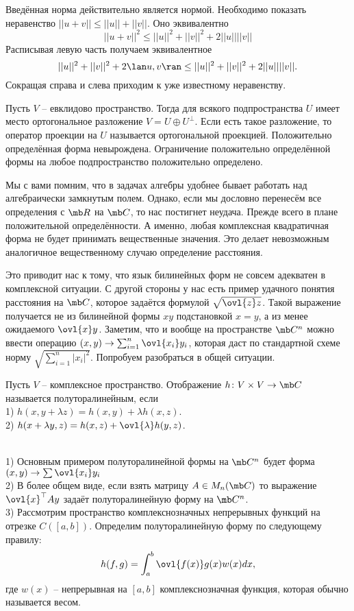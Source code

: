 \lm Введённая норма действительно является нормой.
\proof Необходимо показать неравенство $||u+v||\leq ||u||+||v||$. Оно эквивалентно $$||u+v||^2 \leq ||u||^2+||v||^2+2||u||||v||$$
Расписывая левую часть получаем эквивалентное
$$ ||u||^2+||v||^2+2\lan u,v\ran \leq ||u||^2+||v||^2+2||u||||v||.$$
Сокращая справа и слева приходим к уже известному неравенству.
\endproof
\elm

 
\lm Пусть $V$ -- евклидово пространство. Тогда для всякого подпространства $U$ имеет место ортогональное разложение $V=U\oplus U^{\bot}$. Если есть такое разложение, то оператор проекции на $U$ называется ортогональной проекцией.
\elm
\proof Положительно определённая форма невырождена. Ограничение положительно определённой формы на любое подпространство положительно определено.
\endproof



Мы с вами помним, что в задачах алгебры  удобнее бывает работать над алгебраически замкнутым полем. Однако, если мы дословно перенесём все определения с $\mb R$ на $\mb C$, то нас постигнет неудача. Прежде всего в плане положительной определённости. А именно, любая комплексная квадратичная форма не будет принимать вещественные значения. Это делает невозможным аналогичное вещественному случаю определение расстояния. 

Это приводит нас к тому, что язык билинейных форм не совсем адекватен в комплексной ситуации. С другой стороны у нас есть пример удачного понятия расстояния на $\mb C$, которое задаётся формулой $\sqrt{\ovl{z}z}$. Такой выражение получается не из билинейной формы $xy$ подстановкой $x=y$, а из менее ожидаемого $\ovl{x}y$. Заметим, что и вообще на пространстве $\mb C^n$ можно ввести операцию $
(x,y) \to \sum_{i=1}^n \ovl{x_i}y_i$, которая даст по стандартной схеме норму $\sqrt{\sum_{i=1}^n |x_i|^2}$. Попробуем разобраться в общей ситуации.

\dfn Пусть $V$ -- комплексное пространство.  Отображение $h\colon V \times V \to \mb C$ называется полуторалинейным, если \\
1) $h(x,y+\lambda z)=h(x,y)+\lambda h(x,z)$. \\
2) $h(x+\lambda y,z)=h(x,z)+\ovl{\lambda} h(y,z)$.
\edfn

\exm\\
1) Основным примером полуторалинейной формы на $\mb C^n$ будет форма $(x,y)\to \sum \ovl{x_i}y_i$\\
2) В более общем виде, если взять матрицу $A\in M_n(\mb C)$  то выражение $\ovl{x}^{\top}Ay$ задаёт полуторалинейную форму на $\mb C^n$.\\
3) Рассмотрим пространство комплекснозначных непрерывных функций на отрезке $C([a,b])$. Определим полуторалинейную форму по следующему правилу:
$$h(f,g)=\int_a^b \ovl{f(x)}g(x)w(x)dx,$$
где $w(x)$ -- непрерывная на $[a,b]$ комплекснозначная функция, которая обычно называется весом.\\



